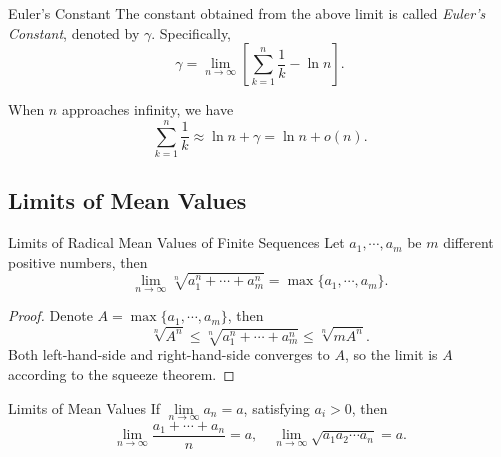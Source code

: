 \begin{definition}{Euler's Constant}{}
  The constant obtained from the above limit is called \emph{Euler's Constant},
  denoted by $\gamma$. Specifically,
  \begin{equation}
    \gamma = \lim \limits _{n \rightarrow \infty} \left[ \sum\limits_{k = 1}^n \frac{1}{k} - \ln n \right].
  \end{equation}
\end{definition}

\begin{corollary}{}{}
  When $n$ approaches infinity, we have
  \begin{equation}
    \sum\limits_{k = 1}^n \frac{1}{k} \approx \ln n + \gamma = \ln n + o(n).
  \end{equation}
\end{corollary}

\subsection{Limits of Mean Values}

\begin{proposition}{Limits of Radical Mean Values of Finite Sequences}{}
  Let $a_1,\cdots,a_m$ be $m$ different positive numbers,
  then
  \begin{equation}
    \lim \limits _{n \rightarrow \infty} \sqrt[n]{a_1^n + \cdots + a_m^n} =
    \max \{a_1,\cdots,a_m\}.
  \end{equation}
\end{proposition}

\begin{proof}
  Denote $A = \max \{a_1,\cdots,a_m\}$,
  then
  \begin{equation}
    \sqrt[n]{A^n} \leq \sqrt[n]{a_1^n + \cdots + a_m^n} \leq \sqrt[n]{mA^n}.
  \end{equation}
  Both left-hand-side and right-hand-side converges to $A$,
  so the limit is $A$ according to the squeeze theorem.
\end{proof}

\begin{proposition}{Limits of Mean Values}{}
  If $\lim \limits _{n \rightarrow \infty} a_n = a$, satisfying $a_i > 0$, then
  \begin{equation}
    \lim \limits _{n \rightarrow \infty} \frac{a_1 +\cdots + a_n}{n} = a, \quad
    \lim \limits _{n \rightarrow \infty} \sqrt{a_1a_2\cdots a_n} = a.
  \end{equation}
\end{proposition}


